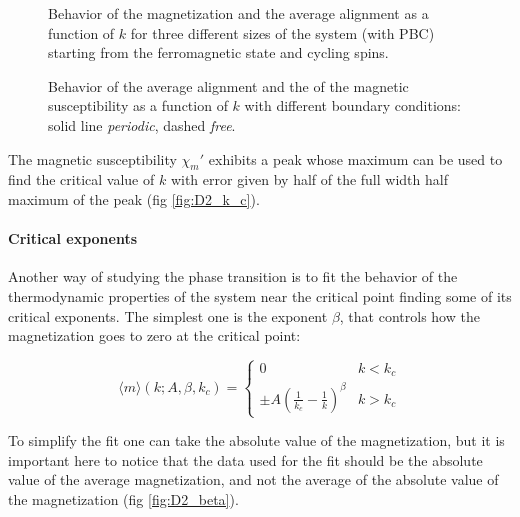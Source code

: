 \documentclass[a4paper, 11pt]{article}
\begin{document}
      \begin{figure}[H]
        \centering
        \caption{Behavior of the magnetization and the average alignment as a function of $k$ for three different sizes of the system (with PBC) starting from the ferromagnetic state and cycling spins.}
        \label{fig:D2_size_dependent}
      \end{figure}

      \begin{figure}[H]
        \centering
        \caption{Behavior of the average alignment and the of the magnetic susceptibility as a function of $k$ with different boundary conditions: solid line \emph{periodic}, dashed \emph{free}.}
        \label{fig:D2_achi}
      \end{figure}

      The magnetic susceptibility $\chi_m'$ exhibits a peak whose maximum can be used to find the critical value of $k$ with error given by half of the full width half maximum of the peak (fig \ref{fig:D2_k_c}).

      \paragraph{Critical exponents}
      Another way of studying the phase transition is to fit the behavior of the thermodynamic properties of the system near the critical point finding some of its critical exponents.
      The simplest one is the exponent $\beta$, that controls how the magnetization goes to zero at the critical point:

      \begin{equation}
        \langle m \rangle (k;A,\beta,k_c) = \begin{cases}
          0 & k < k_c \\
          \pm A \left(\frac{1}{k_c} - \frac{1}{k} \right)^\beta & k > k_c
        \end{cases}
      \end{equation}

      To simplify the fit one can take the absolute value of the magnetization, but it is important here to notice that the data used for the fit should be the absolute value of the average magnetization, and not the average of the absolute value of the magnetization (fig \ref{fig:D2_beta}).
\end{document}

